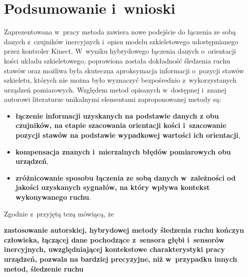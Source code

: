 \chapter{Podsumowanie i~wnioski }\label{chap:finalSummary}

Zaprezentowana w~pracy metoda zawiera nowe podejście do łączenia ze sobą danych z~czujników inercyjnych i~opisu modelu szkieletowego udostępnianego przez kontroler Kinect. W~wyniku hybrydowego łączenia danych o~orientacji kości układu szkieletowego, poprawiona została dokładność śledzenia ruchu stawów oraz możliwa była skuteczna aproksymacja informacji o~pozycji stawów szkieletu, których nie można było wyznaczyć bezpośrednio z~wykorzystanych urządzeń pomiarowych. Względem metod opisanych w~dostępnej i~znanej autorowi literaturze unikalnymi elementami zaproponowanej metody są:
\begin{itemize}
	\item \textbf{łączenie informacji uzyskanych na podstawie danych z obu czujników, na etapie szacowania orientacji kości i~szacowanie pozycji stawów na podstawie wypadkowej wartości ich orientacji},\\
	\item \textbf{kompensacja znanych i~mierzalnych błędów pomiarowych obu urządzeń}, \\
	\item \textbf{zróżnicowanie sposobu łączenia ze sobą danych w~zależności od jakości uzyskanych sygnałów, na który wpływa kontekst wykonywanego ruchu}.
\end{itemize}


Zgodnie z~przyjętą tezą mówiącą, że

\textbf{zastosowanie autorskiej, hybrydowej metody śledzenia ruchu kończyn człowieka, łączącej dane pochodzące z~sensora głębi i~sensorów inercyjnych, uwzględniającej kontekstowe charakterystyki pracy urządzeń, pozwala na bardziej precyzyjne, niż w~przypadku innych metod, śledzenie ruchu}

